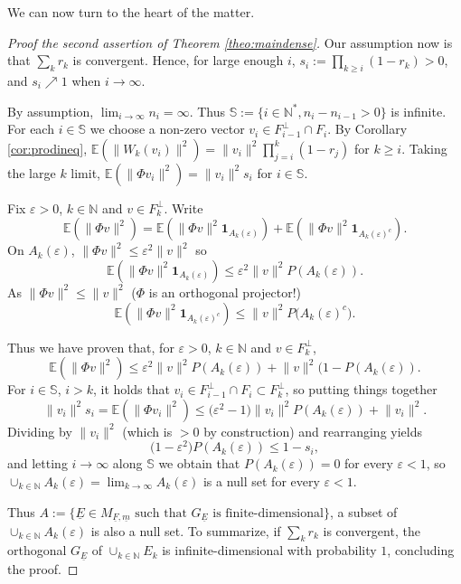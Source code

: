 \documentclass[pdftex]{sigma}%
\newcommand{\norm}[1]{\lVert #1\rVert}
\newcommand{\kN}{k\in \mathbb{N}}
\newcommand{\iN}{i\in \mathbb{N}}
\newcommand{\expec}[1]{\mathbb{E}\left(#1\right)}
\newcommand{\ind}[1]{\mathbf{1}_{#1}}
\begin{document}
We can now turn to the heart of the matter.

\begin{proof}[Proof the second assertion of Theorem \ref{theo:maindense}]
Our assumption now is that $\sum_k r_k$ is convergent. Hence, for large enough $i$, $s_i:=\prod_{k\geq i} (1-r_k) >0$, and $s_i \nearrow 1$ when $i\to \infty$.

By assumption, $\lim_{i\to \infty} n_i=\infty$. Thus $\mathbb{S}:=\{\iN^*, n_i-n_{i-1} >0\}$ is infinite. For each $i\in \mathbb{S}$ we choose a non-zero vector $v_i\in F_{i-1}^{\perp} \cap F_i$. By Corollary \ref{cor:prodineq}, $\expec{\norm{W_k(v_i)}^2}=\norm{v_i}^2\prod_{j=i}^{k} (1-r_j)$ for $k\geq i$. Taking the large $k$ limit, $\expec{\norm{\Phi v_i}^2}=\norm{v_i}^2s_i$ for $i\in \mathbb{S}$.

Fix $\varepsilon >0$, $\kN$ and $v\in F_k^\perp$. Write
\[ \expec{\norm{\Phi v}^2}=\expec{\norm{\Phi v}^2\ind{A_{k}(\varepsilon)}}+ \expec{\norm{\Phi v}^2\ind{A_{k}(\varepsilon)^c}}.\]
On $A_{k}(\varepsilon)$, $\norm{\Phi v}^2\leq \varepsilon^2 \norm{v}^2$ so
\[ \expec{\norm{\Phi v}^2\ind{A_{k}(\varepsilon)}}\leq \varepsilon^2 \norm{v}^2 P(A_{k}(\varepsilon)).\]
As $\norm{\Phi v}^2 \leq \norm{v}^2$ ($\Phi$ is an orthogonal projector!)
\[ \expec{\norm{\Phi v}^2\ind{A_{k}(\varepsilon)^c}}\leq \norm{v}^2P\big(A_{k}(\varepsilon)^c\big).\]

Thus we have proven that, for $\varepsilon >0$, $\kN$ and $v\in F_k^\perp$,
\[ \expec{\norm{\Phi v}^2} \leq \varepsilon^2 \norm{v}^2 P(A_{k}(\varepsilon)) +\norm{v}^2(1-P(A_{k}(\varepsilon)).\]
For $i\in \mathbb{S}$, $i>k$, it holds that $v_i\in F_{i-1}^{\perp} \cap F_i \subset F_k^\perp$, so putting things together
\[ \norm{v_i}^2s_i=\expec{\norm{\Phi v_i}^2} \leq \big(\varepsilon^2-1\big) \norm{v_i}^2 P(A_{k}(\varepsilon)) +\norm{v_i}^2.\]
Dividing by $ \norm{v_i}^2$ (which is $>0$ by construction) and rearranging yields
\[\big(1-\varepsilon^2\big)P(A_{k}(\varepsilon))\leq 1-s_i,\]
and letting $i\to \infty$ along $\mathbb{S}$ we obtain that $P(A_{k}(\varepsilon))=0$ for every $\varepsilon <1$, so $\cup_{\kN} A_{k}(\varepsilon)=\lim_{k\to \infty} A_{k}(\varepsilon)$ is a null set for every $\varepsilon <1$.

Thus $A:=\big\{\underline{E} \in M_{\underline{F},\underline{m}} \text{ such that } G_{\underline{E}}\text{ is finite-dimensional}\big\}$, a subset of $\cup_{\kN} A_{k}(\varepsilon)$ is also a null set. To summarize, if
$\sum_k r_k$ is convergent, the orthogonal $G_{\underline{E}}$ of $\cup_{\kN}E_k$ is infinite-dimensional with probability $1$, concluding the proof.
\end{proof}
\end{document}
